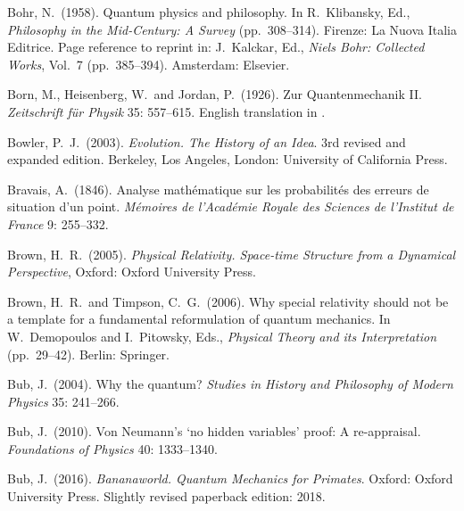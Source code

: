 \documentclass[12pt]{article}
\numberwithin{equation}{section}
\begin{document}
\begin{thebibliography}{}
 Bohr, N.\ (1958). Quantum physics and philosophy. In R.\ Klibansky, Ed., \emph{Philosophy in the Mid-Century: A Survey} (pp.\ 308--314). Firenze: La Nuova Italia Editrice. Page reference to reprint in: J.\ Kalckar, Ed., \emph{Niels Bohr: Collected Works}, Vol.\ 7 (pp.\ 385--394). Amsterdam: Elsevier.



 Born, M., Heisenberg, W.\ and Jordan, P.\ (1926). Zur Quantenmechanik II. \emph{Zeitschrift f\"{u}r Physik}  35: 557--615. English translation in \citet[pp.\ 321--385]{Van der Waerden}.

 Bowler, P.\ J.\ (2003). \emph{Evolution. The History of an Idea}. 3rd revised and expanded edition. Berkeley, Los Angeles, London: University of California Press.

 Bravais, A.\ (1846). Analyse math\'ematique sur les probabilit\'es des erreurs de situation d'un point. \emph{M\'emoires de l'Acad\'emie Royale des Sciences de l'Institut de France} 9: 255--332.

 Brown, H.\ R.\ (2005). \emph{Physical Relativity. Space-time Structure from a Dynamical Perspective}, Oxford: Oxford University Press.

  Brown, H.\ R.\ and Timpson, C.\ G.\ (2006). Why special relativity should not be a template for a fundamental reformulation of quantum mechanics. In W.\ Demopoulos and I.\ Pitowsky, Eds., \emph{Physical Theory and its Interpretation} (pp.\ 29--42). Berlin: Springer.  

 Bub, J.\ (2004). Why the quantum? \emph{Studies in History and Philosophy of Modern Physics} 35: 241--266.

 Bub, J.\ (2010). Von Neumann's `no hidden variables' proof: A re-appraisal.  \emph{Foundations of Physics} 40: 1333--1340.

 Bub, J.\ (2016). \emph{Bananaworld. Quantum Mechanics for Primates}. Oxford: Oxford University Press. Slightly revised paperback edition: 2018.


\end{thebibliography}
\end{document}
